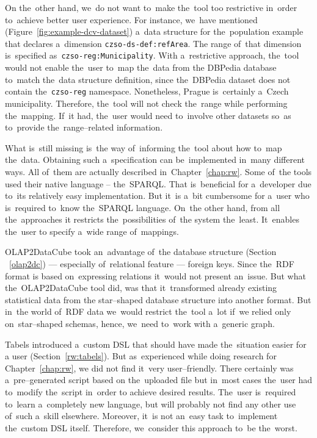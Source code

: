 \begin{sloppypar}
On the~other hand, we~do not want to~make the~tool too restrictive in~order to~achieve better user experience. For instance, we~have mentioned
(Figure~\ref{fig:example-dcv-dataset}) a~data structure 
for the~population example that declares a~dimension \texttt{czso-ds-def:refArea}. 
The range of~that dimension is~specified as~\texttt{czso-reg:Municipality}. 
With a~restrictive approach, the~tool would not enable the~user to~map the~data from 
the DBPedia database to~match the~data structure definition, since the~DBPedia 
dataset does not contain the~\texttt{czso-reg} namespace. Nonetheless, Prague is~certainly a~Czech municipality. Therefore, the~tool will not check the~range 
while performing the~mapping. If~it had, the~user would need to~involve 
other datasets so~as to~provide the~range--related information.
\end{sloppypar}

What is~still missing is~the way of~informing the~tool about how to~map the~data.
Obtaining such a~specification can be~implemented in~many different ways. 
All of~them are actually described in~Chapter~\ref{chap:rw}. Some of~the tools used 
their native language -- the~SPARQL. That is~beneficial for a~developer due to~its relatively easy implementation. But it~is a~bit cumbersome for a~user 
who is~required to~know the~SPARQL language. On~the other hand, from all the~approaches
it restricts the~possibilities of~the system the~least. It~enables the~user 
to specify a~wide range of~mappings.

OLAP2DataCube took an~advantage of~the database structure (Section ~\ref{olap2dc}) --- 
especially of~relational feature --- foreign keys. Since the~RDF format 
is based on~expressing relations it~would not present an~issue. But what the~OLAP2DataCube tool did, was that it~transformed already existing statistical data from
the star--shaped database structure into another format. But in~the world of~RDF 
data we~would restrict the~tool a~lot if~we relied only on~star--shaped 
schemas, hence, we~need to~work with a~generic graph.

Tabels introduced a~custom DSL that should have made the~situation easier for 
a user (Section~\ref{rw:tabels}). But as~experienced while doing research for Chapter~\ref{chap:rw}, 
we did not find it~very user--friendly. There certainly was a~pre--generated script based
on the~uploaded file but in~most cases the~user had to~modify the~script in~order to
achieve desired results. The~user is~required to~learn a~completely new language, but will probably not find any other use of~such a~skill
elsewhere. Moreover, it~is not an~easy task to~implement the~custom DSL itself. Therefore, we~consider this approach to~be the~worst.

